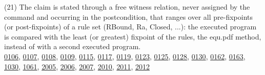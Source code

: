 \documentclass[10pt]{article}
\begin{document}
\begin{description}[leftmargin=1.2em,itemsep=2pt]
\item[\texttt{fixpoint-witness}\label{tag:fixpoint-witness}] (21) The claim is stated through a free witness relation, never assigned by the command and occurring in the postcondition, that ranges over all pre-fixpoints (or post-fixpoints) of a rule set (RBound, Ra, Closed, ...): the executed program is compared with the least (or greatest) fixpoint of the rules, the equ.pdf method, instead of with a second executed program.\\ {\small \hyperref[case:Example0106]{0106}, \hyperref[case:Example0107]{0107}, \hyperref[case:Example0108]{0108}, \hyperref[case:Example0109]{0109}, \hyperref[case:Example0115]{0115}, \hyperref[case:Example0117]{0117}, \hyperref[case:Example0119]{0119}, \hyperref[case:Example0123]{0123}, \hyperref[case:Example0125]{0125}, \hyperref[case:Example0128]{0128}, \hyperref[case:Example0130]{0130}, \hyperref[case:Example0162]{0162}, \hyperref[case:Example0163]{0163}, \hyperref[case:Example1030]{1030}, \hyperref[case:Example1061]{1061}, \hyperref[case:Example2005]{2005}, \hyperref[case:Example2006]{2006}, \hyperref[case:Example2007]{2007}, \hyperref[case:Example2010]{2010}, \hyperref[case:Example2011]{2011}, \hyperref[case:Example2012]{2012}}
\end{description}
\end{document}
